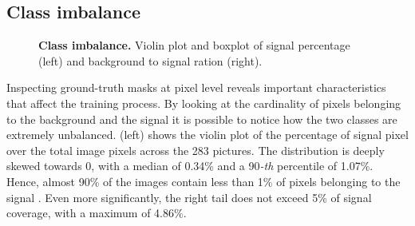 \subsection{Class imbalance}
\label{sec:class_imbalance}
\begin{figure}
    \centering
    \caption{\textbf{Class imbalance.} Violin plot and boxplot of signal percentage (left) and background to signal ration (right).}
    \label{fig:dataset:class_imbalance}
\end{figure}

Inspecting ground-truth masks at pixel level reveals important characteristics that affect the training process. 
By looking at the cardinality of pixels belonging to the background and the signal it is possible to notice how the two classes are extremely unbalanced.
 (left) shows the violin plot of the percentage of signal pixel over the total image pixels across the 283 pictures.
The distribution is deeply skewed towards 0, with a median of 0.34\% and a 90\emph{-th} percentile of 1.07\%. 
Hence, almost 90\% of the images contain less than 1\% of pixels belonging to the signal%
.
Even more significantly, the right tail does not exceed 5\% of signal coverage, with a maximum of 4.86\%.

